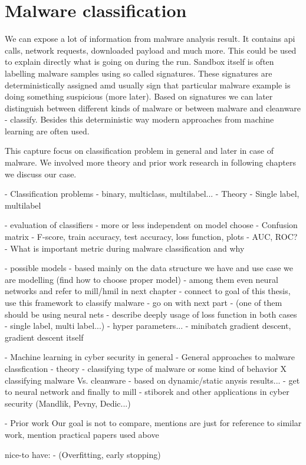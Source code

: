 \chapter{Malware classification}
We can expose a lot of information from malware analysis result. It contains api calls, network requests, downloaded payload and much more. This could be used to explain directly what is going on during the run. Sandbox itself is often labelling malware samples using so called signatures. These signatures are deterministically assigned amd usually sign that particular malware example is doing something suspicious (more later). Based on signatures we can later distinguish between different kinds of malware or between malware and cleanware - classify. Besides this deterministic way modern approaches from machine learning are often used.

This capture focus on classification problem in general and later in case of malware. We involved more theory and prior work research in following chapters we discuss our case.

- Classification problems - binary, multiclass, multilabel...
- Theory
- Single label, multilabel

- evaluation of classifiers - more or less independent on model choose
  - Confusion matrix
  - F-score, train accuracy, test accuracy, loss function, plots
        - AUC, ROC?
  - What is important metric during malware classification and why

- possible models - based mainly on the data structure we have and use case we are modelling (find how to choose proper model)
    - among them even neural networks and refer to mill/hmil in next chapter - connect to goal of this thesis, use this framework to classify malware - go on with next part
- (one of them should be using neural nets - describe deeply usage of loss function in both cases - single label, multi label...)
- hyper parameters...
- minibatch gradient descent, gradient descent itself



- Machine learning in cyber security in general
- General approaches to malware classfication - theory
    - classifying type of malware or some kind of behavior X classifying malware Vs. cleanware
    - based on dynamic/static anysis results...
    - get to neural network and finally to mill - stiborek and other applications in cyber security (Mandlik, Pevny, Dedic...)


- Prior work
Our goal is not to compare, mentions are just for reference to similar work, mention practical papers used above

nice-to have:
- (Overfitting, early stopping)



